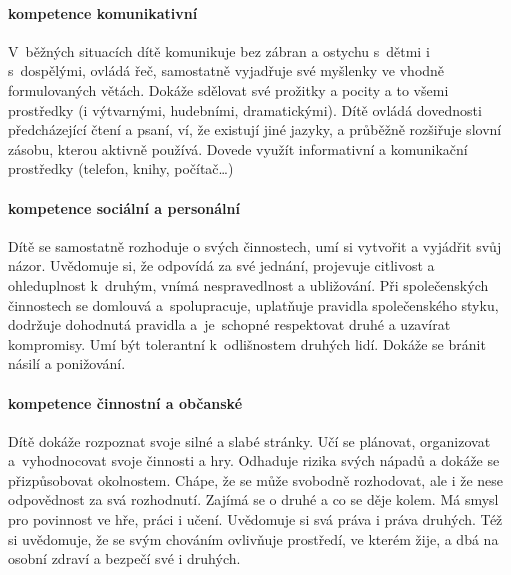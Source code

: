 				\paragraph{kompetence komunikativní}
					V běžných situacích dítě komunikuje bez zábran a ostychu s dětmi i s dospělými, ovládá řeč, samostatně vyjadřuje své myšlenky ve vhodně formulovaných větách. Dokáže sdělovat své prožitky a pocity a to všemi prostředky (i výtvarnými, hudebními, dramatickými). Dítě ovládá dovednosti předcházející čtení a psaní, ví, že existují jiné jazyky, a průběžně rozšiřuje slovní zásobu, kterou aktivně používá. Dovede využít informativní a komunikační prostředky (telefon, knihy, počítač…)

				\paragraph{kompetence sociální a personální}
					Dítě se samostatně rozhoduje o svých činnostech, umí si vytvořit a vyjádřit svůj názor. Uvědomuje si, že odpovídá za své jednání, projevuje citlivost a ohleduplnost k druhým, vnímá nespravedlnost a ubližování. Při společenských činnostech se domlouvá a spolupracuje, uplatňuje pravidla společenského styku, dodržuje dohodnutá pravidla a je schopné respektovat druhé a uzavírat kompromisy. Umí být tolerantní k odlišnostem druhých lidí. Dokáže se bránit násilí a ponižování.

				\paragraph{kompetence činnostní a občanské}
					Dítě dokáže rozpoznat svoje silné a slabé stránky. Učí se plánovat, organizovat a vyhodnocovat svoje činnosti a hry. Odhaduje rizika svých nápadů a dokáže se přizpůsobovat okolnostem. Chápe, že se může svobodně rozhodovat, ale i že nese odpovědnost za svá rozhodnutí. Zajímá se o druhé a co se děje kolem. Má smysl pro povinnost ve hře, práci i učení. Uvědomuje si svá práva i práva druhých. Též si uvědomuje, že se svým chováním ovlivňuje prostředí, ve kterém žije, a dbá na osobní zdraví a bezpečí své i druhých. 



